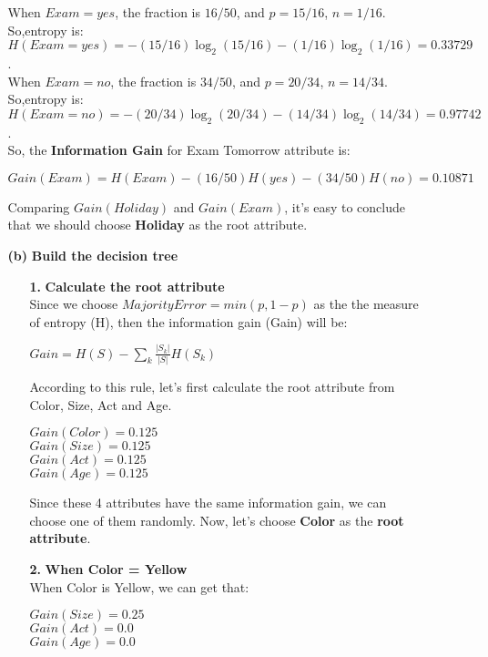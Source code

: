 \begin{enumerate}
\begin{enumerate}
When $Exam = yes$, the fraction is $16/50$, and $p = 15/16$, $n = 1/16$. So,entropy is: $H(Exam=yes) = -(15/16)\log_2(15/16)-(1/16)\log_2(1/16) = 0.33729$.\\

When $Exam = no$, the fraction is $34/50$, and $p = 20/34$, $n = 14/34$. So,entropy is: $H(Exam=no) = -(20/34)\log_2(20/34)-(14/34)\log_2(14/34) = 0.97742$.\\

So, the {\bf Information Gain} for Exam Tomorrow attribute is:\\
\begin{center}
$Gain(Exam) = H(Exam) - (16/50)H(yes)-(34/50)H(no) = 0.10871$\\
\end{center}

Comparing $Gain(Holiday)$ and $Gain(Exam)$, it's easy to conclude that we should choose {\bf Holiday} as the root attribute.\\


\item[{\bf (b)}] {\bf Build the decision tree}\\

\begin{enumerate}
\item[{\bf 1.}] {\bf Calculate the root attribute}\\

Since we choose $MajorityError = min(p, 1-p)$ as the the measure of entropy (H), then the information gain (Gain) will be:\\
\begin{center}
$ Gain = H(S) - \sum_{k} \frac{|S_k|}{|S|} H(S_k)$
\end{center}

According to this rule, let's first calculate the root attribute from Color, Size, Act and Age.\\
\begin{center}
$ Gain(Color) = 0.125 $ \\
$ Gain(Size) = 0.125 $ \\
$ Gain(Act) = 0.125 $ \\
$ Gain(Age) = 0.125 $ \\
\end{center}

Since these 4 attributes have the same information gain, we can choose one of them randomly. Now, let's choose {\bf Color} as the {\bf root attribute}.\\

\item[{\bf 2.}] {\bf When Color = Yellow}\\
When Color is Yellow, we can get that:\\
\begin{center}
$ Gain(Size) = 0.25 $ \\
$ Gain(Act) = 0.0 $ \\
$ Gain(Age) = 0.0 $ \\
\end{center}


\end{enumerate}
\end{enumerate}
\end{enumerate}
